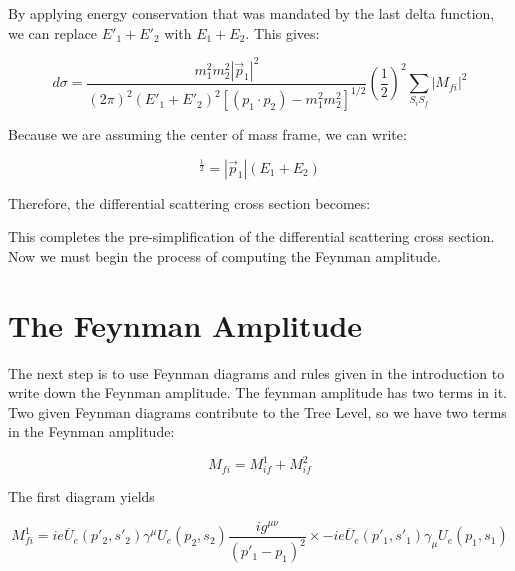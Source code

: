 \documentclass[a4]{article}
\begin{document}
    By applying energy conservation that was mandated by the last delta function, we can replace $E'_1 + E'_2$ with $E_1 + E_2$. This gives:

    \begin{equation}
        d \sigma = \frac{m_1^2 m_2^2 |\vec{p}_1|^2}{(2 \pi)^2 (E'_1 + E'_2)^2 [(p_1 \cdot p_2) - m_1^2 m_2^2]^{1/2}} (\frac{1}{2})^2 \sum_{S_i S_f} |M_{fi}|^2
    \end{equation}

    Because we are assuming the center of mass frame, we can write:

    \begin{equation}
        [(p_1 \cdot p_2)^2 - m_1^2 m_2^2]^\frac{1}{2} = |\vec{p}_1| (E_1 + E_2)
    \end{equation}

    Therefore, the differential scattering cross section becomes:

    \begin{center}
    \end{center}

    This completes the pre-simplification of the differential scattering cross section. Now we must begin the process of computing the Feynman amplitude.

    \section*{The Feynman Amplitude}

    The next step is to use Feynman diagrams and rules given in the introduction to write down the Feynman amplitude. The feynman amplitude has two terms in it. Two given Feynman diagrams contribute to the
    Tree Level, so we have two terms in the Feynman amplitude:

    \begin{equation}
        M_{fi} = M_{if}^1 + M_{if}^2
    \end{equation}

    The first diagram yields

    \begin{equation}
        M_{fi}^1 = i e \overline{U}_e (p'_2, s'_2) \gamma^{\mu} U_e (p_2, s_2) \frac{i g^{\mu \nu}}{(p'_1 - p_1)^2} \times - i e \overline{U}_e (p'_1, s'_1) \gamma_{\mu} U_e (p_1, s_1)
    \end{equation}
\end{document}
